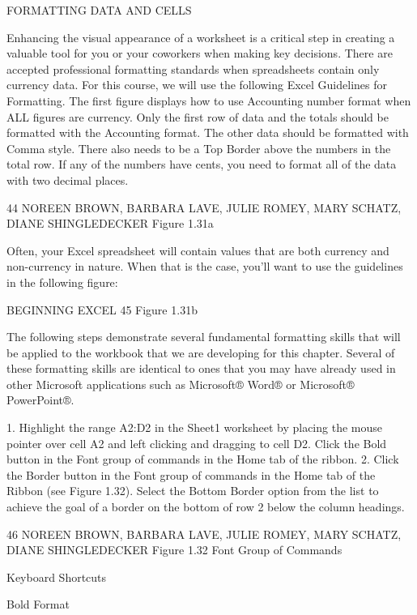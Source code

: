 FORMATTING DATA AND CELLS

Enhancing the visual appearance of a worksheet is a critical step in creating a valuable tool for you
or your coworkers when making key decisions. There are accepted professional formatting standards
when spreadsheets contain only currency data. For this course, we will use the following Excel
Guidelines for Formatting. The first figure displays how to use Accounting number format when ALL
figures are currency. Only the first row of data and the totals should be formatted with the Accounting
format. The other data should be formatted with Comma style. There also needs to be a Top Border
above the numbers in the total row. If any of the numbers have cents, you need to format all of the
data with two decimal places.




44 NOREEN BROWN, BARBARA LAVE, JULIE ROMEY, MARY SCHATZ, DIANE SHINGLEDECKER
Figure 1.31a


Often, your Excel spreadsheet will contain values that are both currency and non-currency in nature.
When that is the case, you’ll want to use the guidelines in the following figure:




BEGINNING EXCEL 45
Figure 1.31b


The following steps demonstrate several fundamental formatting skills that will be applied to the
workbook that we are developing for this chapter. Several of these formatting skills are identical to
ones that you may have already used in other Microsoft applications such as Microsoft® Word® or
Microsoft® PowerPoint®.

1. Highlight the range A2:D2 in the Sheet1 worksheet by placing the mouse pointer over cell A2
and left clicking and dragging to cell D2. Click the Bold button in the Font group of commands
in the Home tab of the ribbon.
2. Click the Border button in the Font group of commands in the Home tab of the Ribbon
(see Figure 1.32). Select the Bottom Border option from the list to achieve the goal of a border
on the bottom of row 2 below the column headings.




46 NOREEN BROWN, BARBARA LAVE, JULIE ROMEY, MARY SCHATZ, DIANE SHINGLEDECKER
Figure 1.32 Font Group of Commands




Keyboard Shortcuts


Bold Format




